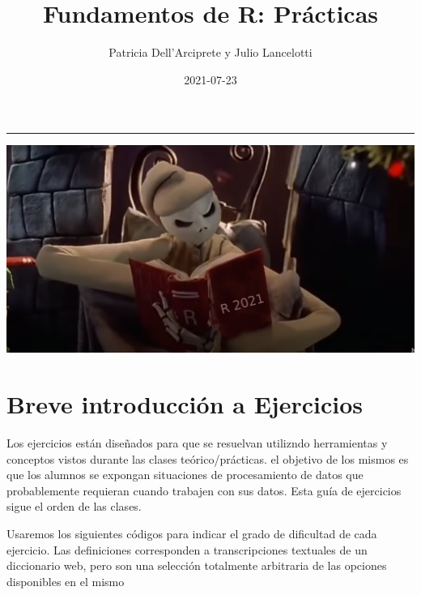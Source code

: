 \documentclass[]{book}
\title{Fundamentos de R: Prácticas}
\author{Patricia Dell'Arciprete y Julio Lancelotti}
\date{2021-07-23}
\begin{document}
\maketitle

{
\setcounter{tocdepth}{1}
\tableofcontents
}
\hypertarget{section}{%
\chapter*{}\label{section}}

\begin{center}\rule{0.5\linewidth}{0.5pt}\end{center}

\begin{center}\includegraphics[width=1\linewidth]{figuras/jackED} \end{center}

\hypertarget{breve-introducciuxf3n-a-ejercicios}{%
\chapter*{Breve introducción a Ejercicios}\label{breve-introducciuxf3n-a-ejercicios}}

Los ejercicios están diseñados para que se resuelvan utilizndo herramientas y conceptos vistos durante las clases teórico/prácticas. el objetivo de los mismos es que los alumnos se expongan situaciones de procesamiento de datos que probablemente requieran cuando trabajen con sus datos. Esta guía de ejercicios sigue el orden de las clases.

Usaremos los siguientes códigos para indicar el grado de dificultad de cada ejercicio. Las definiciones corresponden a transcripciones textuales de un diccionario web, pero son una selección totalmente arbitraria de las opciones disponibles en el mismo
\end{document}
